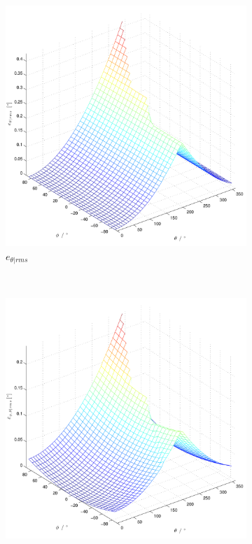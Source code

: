 \begin{figure}
\begin{subfigure}[b]{0.48\textwidth}
                \includegraphics[width=\textwidth]{grafiken/02_Konzeptionierung/angle_error_theta}
                \caption{$e_{\theta | rms}$}
                \label{fig:angle_error_theta}
        \end{subfigure}
        ~ %
        \begin{subfigure}[b]{0.48\textwidth}
                \centering
                \includegraphics[width=\textwidth]{grafiken/02_Konzeptionierung/angle_error_mid}

\end{subfigure}
\end{figure}

